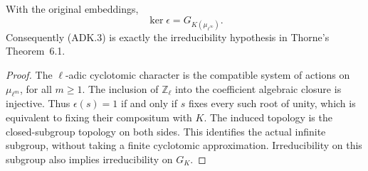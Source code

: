 \begin{lemma}
\label{claim:ADK2}
With the original embeddings,
\[
 \ker\epsilon=G_{K(\mu_{\ell^\infty})}.
 \tag{ADK.7}
\]
Consequently (ADK.3) is exactly the irreducibility hypothesis in
Thorne's Theorem~6.1.
\end{lemma}
\begin{proof}
The $\ell$-adic cyclotomic character is the compatible system of
actions on $\mu_{\ell^m}$, for all $m\ge1$.  The inclusion of
$\mathbb Z_\ell$ into the coefficient algebraic closure is
injective.  Thus $\epsilon(s)=1$ if and only if $s$ fixes every such
root of unity, which is equivalent to fixing their compositum with
$K$.  The induced topology is the closed-subgroup topology on both
sides.  This identifies the actual infinite subgroup, without taking
a finite cyclotomic approximation.  Irreducibility on this subgroup
also implies irreducibility on $G_K$.
\end{proof}

